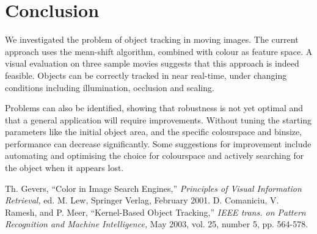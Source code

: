 \documentclass[a4paper,11pt]{article}
\begin{document}
\section{Conclusion}
\label{sec:conclusion}
We investigated the problem of object tracking in moving images.
The current approach uses the mean-shift algorithm, combined with colour as feature space.
A visual evaluation on three sample movies suggests that this approach is indeed feasible.
Objects can be correctly tracked in near real-time, under changing conditions including illumination, occlusion and scaling.

Problems can also be identified, showing that robustness is not yet optimal and that a general application will require improvements.
Without tuning the starting parameters like the initial object area, and the specific colourspace and binsize, performance can decrease significantly.
Some suggestions for improvement include automating and optimising the choice for colourspace and actively searching for the object when it appears lost.


\begin{thebibliography}{1}
   Th. Gevers, ``Color in Image Search Engines,'' {\it Principles of Visual Information Retrieval,} ed. M. Lew, Springer Verlag, February 2001.
   D. Comaniciu, V. Ramesh, and P. Meer, ``Kernel-Based Object Tracking,'' {\it IEEE trans. on Pattern Recognition and Machine Intelligence,} May 2003, vol. 25, number 5, pp. 564-578.
\end{thebibliography}
\end{document}
